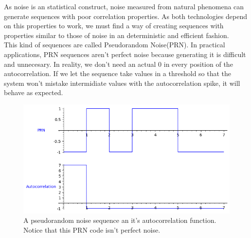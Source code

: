 As noise is an statistical construct, noise measured from natural phenomena
can generate sequences with poor correlation properties. As both technologies
depend on this properties to work, we must find a way of creating sequences
with properties similar to those of noise in an deterministic and efficient
fashion.\\

This kind of sequences are called Pseudorandom Noise(PRN). In practical
applications, PRN sequences aren't perfect noise because generating it is
difficult and unnecesary. In reality, we don't need an actual 0 in every
position of the autocorrelation. If we let the sequence take values in a
threshold so that the system won't mistake intermidiate values with the
autocorrelation spike, it will behave as expected.

\begin{figure}[ht!] %
\begin{center}
\includegraphics[width=0.7\linewidth]{Chapters/Introduction/signals_prn}
\end{center}
\caption{A pseudorandom noise sequence an it's autocorrelation function.
Notice that this PRN code isn't perfect noise.}
\label{introduction_signals_autocorrelation}
\end{figure}


